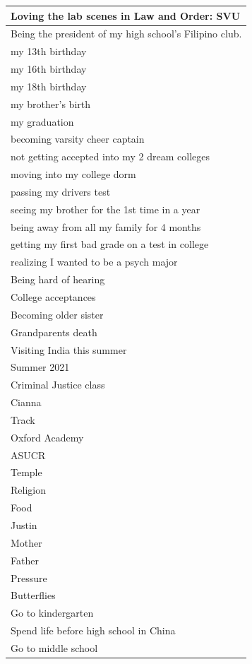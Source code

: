 \documentclass[
  .7em,
  letterpaper,
  DIV=11,
  numbers=noendperiod]{scrartcl}
\begin{document}
\begin{table}
\begin{tabular}{l}
\hline
Loving the lab scenes in Law and Order: SVU\\
\hline
Being the president of my high school's Filipino club.\\
\hline
my 13th birthday\\
\hline
my 16th birthday\\
\hline
my 18th birthday\\
\hline
my brother's birth\\
\hline
my graduation\\
\hline
becoming varsity cheer captain\\
\hline
not getting accepted into my 2 dream colleges\\
\hline
moving into my college dorm\\
\hline
passing my drivers test\\
\hline
seeing my brother for the 1st time in a year\\
\hline
being away from all my family for 4 months\\
\hline
getting my first bad grade on a test in college\\
\hline
realizing I wanted to be a psych major\\
\hline
Being hard of hearing\\
\hline
College acceptances\\
\hline
Becoming older sister\\
\hline
Grandparents death\\
\hline
Visiting India this summer\\
\hline
Summer 2021\\
\hline
Criminal Justice class\\
\hline
Cianna\\
\hline
Track\\
\hline
Oxford Academy\\
\hline
ASUCR\\
\hline
Temple\\
\hline
Religion\\
\hline
Food\\
\hline
Justin\\
\hline
Mother\\
\hline
Father\\
\hline
Pressure\\
\hline
Butterflies\\
\hline
Go to kindergarten\\
\hline
Spend life before high school in China\\
\hline
Go to middle school\\

\end{tabular}
\end{table}
\end{document}
